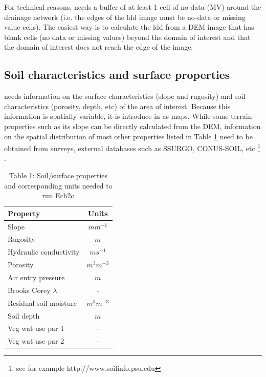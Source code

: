  \medskip 
\begin{Frame}
For technical reasons, \echo   needs a buffer of at least 1 cell of no-data (MV) around the drainage network (i.e. the edges of the ldd image must be no-data or missing value cells). The easiest way is to calculate the ldd from a DEM image that has blank cells (no data or missing values) beyond the domain of interest and that the domain of interest does not reach the edge of the image.  
\end{Frame}
 \medskip

\subsection{Soil characteristics and surface properties}

\echo needs information on the surface characteristics (slope and rugosity) and soil characteristics (porosity, depth, etc) of the area of interest. Because this information is spatially variable, it is introduce in \echo  as maps. While some terrain properties such as its slope can be directly calculated from the DEM, information on the spatial distribution of most other properties listed in Table \ref{tab:soilvars} need to be obtained from surveys, external databases such as SSURGO, CONUS-SOIL, etc \footnote{see for example http://www.soilinfo.psu.edu} .

\begin{center}
\begin{table}
\begin{tabular}{|l|c|}
\hline 
Property & Units \\ 
\hline 
Slope & $m m^{-1}$ \\ 
\hline 
Rugosity & $m$ \\ 
\hline 
Hydraulic conductivity & $m s^{-1}$ \\ 
\hline 
Porosity & $m^{3} m^{-3}$ \\ 
\hline 
Air entry pressure & $m$ \\ 
\hline 
Brooks Corey $\lambda$ & - \\ 
\hline 
Residual soil moisture & $m^{3} m^{-3}$ \\ 
\hline 
Soil depth & $m$ \\ 
\hline 
Veg wat use par 1 & - \\ 
\hline 
Veg wat use par 2 & - \\ 
\hline 
\end{tabular}
\caption{Table \ref{tab:soilvars}: Soil/surface properties and corresponding units needed to run Ech2o}
\label{tab:soilvars}
\end{table} 
\end{center} 


